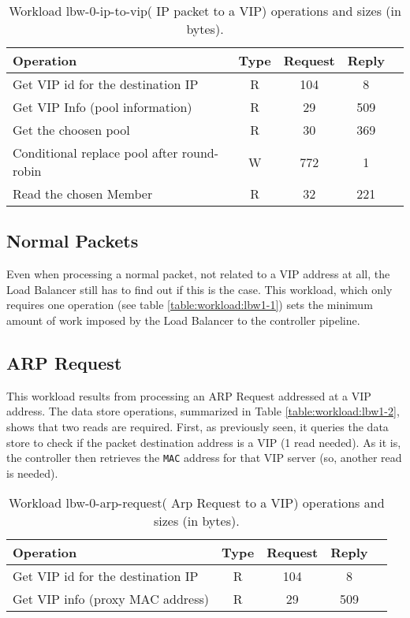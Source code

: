 

\begin{table}[H]
\centering 
\begin{tabular}{l c c c c}
 Operation & Type & Request & Reply \\ \toprule 
 
Get VIP id for the destination IP & R & 104 & 8\\\midrule
Get VIP Info (pool information) & R & 29 & 509\\\midrule
Get the choosen pool & R & 30 & 369\\\midrule
Conditional replace pool after round-robin & W & 772 & 1\\\midrule
Read the chosen Member & R & 32 & 221 \\\bottomrule
\end{tabular}\caption[Workload lbw-0-ip-to-vip( IP packet to a VIP)
operations]{Workload lbw-0-ip-to-vip( IP packet to a VIP) operations
  and sizes (in bytes).}\end{table}

\subsection{Normal Packets}
Even when processing a normal packet, not related to a VIP address at
all, the Load Balancer still has to find out if this is the case. This workload, which only requires one operation (see
table \ref{table:workload:lbw1-1}) sets the minimum amount of work imposed by
the Load Balancer to the controller pipeline. 

\subsection{ARP Request}
This workload  results  from processing an ARP Request addressed at a
VIP address. The data store operations, summarized in Table
\ref{table:workload:lbw1-2}, shows that two reads are
required. First, as previously seen,  it queries the data
store to check if the packet destination address is a VIP (1 read
needed). As it is, the controller then retrieves the \texttt{MAC} address for that
VIP server (so, another read is needed).

\begin{table}[ht]
\small
\centering 
\begin{tabular}{l c c c c}
Operation & Type & Request & Reply \\ \toprule 
Get VIP id for the destination IP  & R & 104 & 8\\\midrule
Get VIP info (proxy MAC address) & R & 29 & 509 \\\bottomrule
\end{tabular}\caption[Workload lbw-0-arp-request( Arp Request to a
VIP) operations]{Workload lbw-0-arp-request( Arp Request to a VIP)
 operations and sizes (in bytes).}
\end{table}



